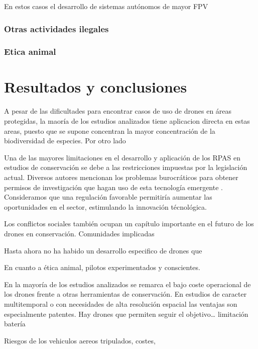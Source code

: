 \documentclass[11pt,]{article}
\begin{document}
En estos casos el desarrollo de sistemas autónomos de mayor FPV

\subsubsection{Otras actividades
ilegales}\label{otras-actividades-ilegales}

\subsubsection{Etica animal}\label{etica-animal}

\citep{Ditmer2015}

\section{Resultados y conclusiones}\label{resultados-y-conclusiones}

A pesar de las dificultades para encontrar casos de uso de drones en
áreas protegidas, la maoría de los estudios analizados tiene aplicacion
directa en estas areas, puesto que se supone concentran la mayor
concentración de la biodiversidad de especies. Por otro lado

Una de las mayores limitaciones en el desarrollo y aplicación de los
RPAS en estudios de conservación se debe a las restricciones impuestas
por la legislación actual. Diversos autores mencionan los problemas
burocráticos para obtener permisos de investigación que hagan uso de
esta tecnología emergente \citep{FEE:FEE201513274}. Consideramos que una
regulación favorable permitiría aumentar las oportunidades en el sector,
estimulando la innovación técnológica.

Los conflictos sociales también ocupan un capítulo importante en el
futuro de los drones en conservación. Comunidades implicadas

Hasta ahora no ha habido un desarrollo especifico de drones que

En cuanto a ética animal, pilotos experimentados y conscientes.

En la mayoría de los estudios analizados se remarca el bajo coste
operacional de los drones frente a otras herramientas de conservación.
En estudios de caracter multitemporal o con necesidades de alta
resolución espacial las ventajas son especialmente patentes. Hay drones
que permiten seguir el objetivo\ldots{} limitación batería

Riesgos de los vehiculos aereos tripulados, costes,
\end{document}
